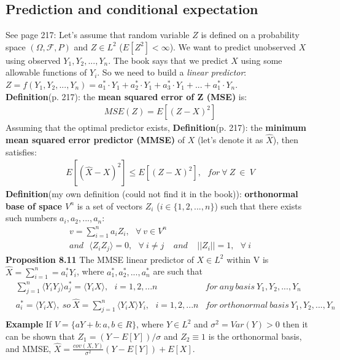 \documentclass[]{article}
\begin{document}
\subsection{Prediction and conditional expectation}
See page 217: Let's assume that random variable $Z$ is defined on a probability space $(\Omega, \mathcal{F}, P)$ and $Z \in L^2$ ($E[Z^2] < \infty$). We want to predict unobserved $X$ using observed $Y_1, Y_2, ..., Y_n$. The book says that we predict $X$ using some allowable functions of $Y_i$. So we need to build a \emph{linear predictor}: $Z = f(Y_1, Y_2, ..., Y_n) = a^*_1\cdot Y_1 + a^*_2\cdot Y_1 + a^*_3\cdot Y_1 + ... + a^*_1\cdot Y_n$.\\
\textbf{Definition}(p. 217): the \textbf{mean squared error of Z (MSE)} is:
$$
\begin{aligned}
	MSE(Z) = E[(Z - X)^2]
	\end{aligned}
$$
Assuming that the optimal predictor exists,
\textbf{Definition}(p. 217): the \textbf{minimum mean squared error predictor (MMSE)} of $X$ (let's denote it as $\hat{X}$), then satisfies:
$$
\begin{aligned}
	E[(\hat{X} - X)^2] \leq E[(Z - X)^2], ~~~for~ \forall~Z~\in~ V
	\end{aligned}
$$
\textbf{Definition}(my own definition (could not find it in the book)): \textbf{orthonormal base of space $V^n$} is a set of vectors $Z_i$ ($i \in \{1, 2, ..., n\}$) such that there exists such numbers $a_i, a_2, ..., a_n$:
$$
\begin{aligned}
	v = \sum_{i=1}^n a_i Z_i, ~~~\forall ~v\in V^n\\
	and ~~~\langle Z_i Z_j \rangle = 0, ~~~\forall~i\neq j ~~~~~ and ~~~~~
	||Z_i|| = 1, ~~~\forall~i
	\end{aligned}
$$
\textbf{Proposition 8.11} The MMSE linear predictor of $X\in L^2$ within V is $\hat{X} = \sum_{i=1}^n = a_i^*Y_i$, where $a^*_1, a^*_2, ..., a^*_n$ are such that
$$
\begin{aligned}
	&\sum_{j=1}^n  \langle Y_i Y_j \rangle a_j^* = \langle Y_i X \rangle, ~~~ i=1,2,...n
	&for ~ any ~basis~Y_1, Y_2, ..., Y_n\\
	&a_i^*= \langle Y_i X \rangle,~so~ \hat{X}= \sum_{j=1}^n \langle Y_i X \rangle Y_i, ~~~ i=1,2,...n
	&for ~ orthonormal ~basis~Y_1, Y_2, ..., Y_n\\
	\end{aligned}
$$
\textbf{Example} If $V = \{ aY + b: a,b \in R\}$, where $Y\in L^2$ and $\sigma^2 = Var(Y)>0$ then it can be shown that $Z_1=(Y-E[Y])/\sigma$ and $Z_2\equiv 1$ is the orthonormal basis, and MMSE, $\hat{X} = \frac{cov(X, Y)}{\sigma^2} (Y-E[Y]) + E[X]$.
\end{document}
